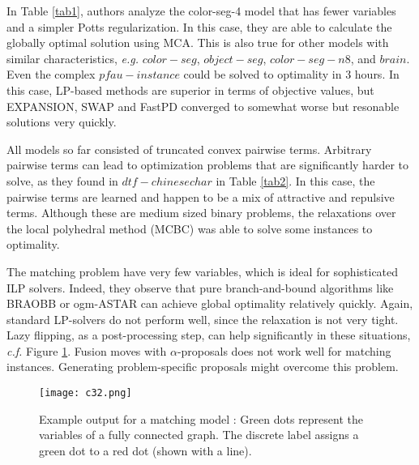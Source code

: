 \documentclass[10pt,twocolumn,letterpaper]{article}
\begin{document}
In Table \ref{tab1}, authors analyze the color-seg-4 model that has fewer variables and a simpler Potts regularization. In this case, they are able to calculate the globally optimal solution using MCA. This is also true for other models with similar characteristics, \emph{e.g.} $color-seg$, $object-seg$, $color-seg-n8$, and $brain$. Even the complex $pfau-instance$ could be solved to optimality in 3 hours. In this case, LP-based methods are superior in terms of objective values, but EXPANSION, SWAP and FastPD converged to somewhat worse but resonable solutions very quickly.
 
All models so far consisted of truncated convex pairwise terms. Arbitrary pairwise terms can lead to optimization problems that are significantly harder to solve, as they found in $dtf-chinesechar$ in Table \ref{tab2}. In this case, the pairwise terms are learned and happen to be a mix of attractive and repulsive terms. Although these are medium sized binary problems, the relaxations over the local polyhedral method (MCBC) \cite{Towards} was able to solve some instances to optimality.

The matching problem have very few variables, which is ideal for sophisticated ILP solvers. Indeed, they observe that pure branch-and-bound algorithms like BRAOBB or ogm-ASTAR can achieve global optimality relatively quickly. Again, standard LP-solvers do not perform well, since the relaxation is not very tight. Lazy flipping, as a post-processing step, can help significantly in these situations, \emph{c.f.} Figure \ref{fig2}. Fusion moves with $\alpha$-proposals does not work well for matching instances. Generating problem-specific proposals might overcome this problem.

\begin{figure}[htbp]
\begin{center}
\texttt{[image: c32.png]}
\end{center}
\caption{Example output for a matching model \cite{Beyond}: Green dots represent the variables of a fully connected graph. The discrete label assigns a green dot to a red dot (shown with a line).}
\label{fig2}
\end{figure}

{\small


}
\end{document}
